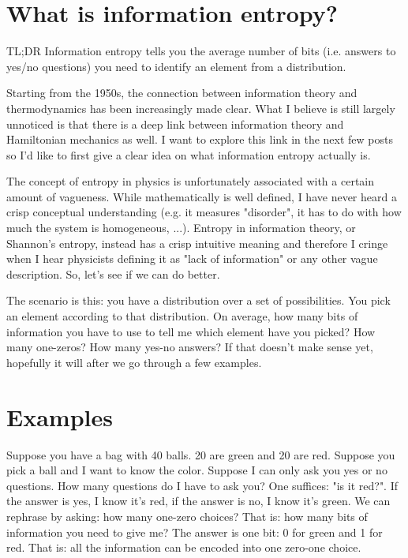 \documentclass[aps,pra,10pt,floatfix,nofootinbib]{revtex4-1}
\theoremstyle{definition}
\begin{document}
	
\section{What is information entropy?}

TL;DR Information entropy tells you the average number of bits (i.e. answers to yes/no questions) you need to identify an element from a distribution.

Starting from the 1950s, the connection between information theory and thermodynamics has been increasingly made clear. What I believe is still largely unnoticed is that there is a deep link between information theory and Hamiltonian mechanics as well. I want to explore this link in the next few posts so I'd like to first give a clear idea on what information entropy actually is.

The concept of entropy in physics is unfortunately associated with a certain amount of vagueness. While mathematically is well defined, I have never heard a crisp conceptual understanding (e.g. it measures "disorder", it has to do with how much the system is homogeneous, ...). Entropy in information theory, or Shannon's entropy, instead has a crisp intuitive meaning and therefore I cringe when I hear physicists defining it as "lack of information" or any other vague description. So, let's see if we can do better.

The scenario is this: you have a distribution over a set of possibilities. You pick an element according to that distribution. On average, how many bits of information you have to use to tell me which element have you picked? How many one-zeros? How many yes-no answers? If that doesn't make sense yet, hopefully it will after we go through a few examples.

\section{Examples}

Suppose you have a bag with 40 balls. 20 are green and 20 are red. Suppose you pick a ball and I want to know the color. Suppose I can only ask you yes or no questions. How many questions do I have to ask you? One suffices: "is it red?". If the answer is yes, I know it's red, if the answer is no, I know it's green. We can rephrase by asking: how many one-zero choices? That is: how many bits of information you need to give me? The answer is one bit: 0 for green and 1 for red. That is: all the information can be encoded into one zero-one choice.
\end{document}

